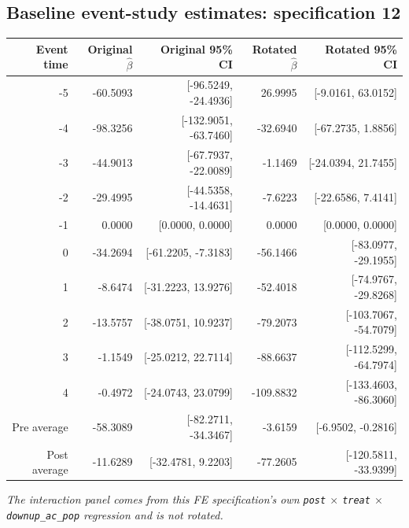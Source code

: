 \documentclass[10pt]{article}
\begin{document}
\subsection*{Baseline event-study estimates: specification 12}
\begin{center}
\scriptsize
\begin{tabular}{r rr rr}
\toprule
Event time & Original $\hat\beta$ & Original 95\% CI & Rotated $\hat\beta$ & Rotated 95\% CI \\
\midrule
-5 & -60.5093 & [-96.5249, -24.4936] & 26.9995 & [-9.0161, 63.0152] \\
-4 & -98.3256 & [-132.9051, -63.7460] & -32.6940 & [-67.2735, 1.8856] \\
-3 & -44.9013 & [-67.7937, -22.0089] & -1.1469 & [-24.0394, 21.7455] \\
-2 & -29.4995 & [-44.5358, -14.4631] & -7.6223 & [-22.6586, 7.4141] \\
-1 & 0.0000 & [0.0000, 0.0000] & 0.0000 & [0.0000, 0.0000] \\
0 & -34.2694 & [-61.2205, -7.3183] & -56.1466 & [-83.0977, -29.1955] \\
1 & -8.6474 & [-31.2223, 13.9276] & -52.4018 & [-74.9767, -29.8268] \\
2 & -13.5757 & [-38.0751, 10.9237] & -79.2073 & [-103.7067, -54.7079] \\
3 & -1.1549 & [-25.0212, 22.7114] & -88.6637 & [-112.5299, -64.7974] \\
4 & -0.4972 & [-24.0743, 23.0799] & -109.8832 & [-133.4603, -86.3060] \\
\midrule
Pre average & -58.3089 & [-82.2711, -34.3467] & -3.6159 & [-6.9502, -0.2816] \\
Post average & -11.6289 & [-32.4781, 9.2203] & -77.2605 & [-120.5811, -33.9399] \\
\bottomrule
\end{tabular}
\end{center}
\medskip
\textit{The interaction panel comes from this FE specification's own \texttt{post} $\times$ \texttt{treat} $\times$ \texttt{downup\_ac\_pop} regression and is not rotated.}
\clearpage
\end{document}
